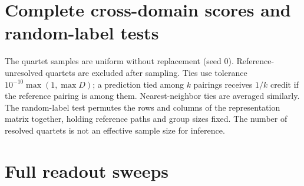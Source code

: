 \documentclass[mlmain]{jmlr}
\begin{document}
\section{Complete cross-domain scores and random-label tests}
\label{app:fullresults}

\begin{table}[h]
\centering\small
\caption{E: Euclidean; C: cosine; FM: FastME. $Q_D$ is direct distance quartet agreement, while
$Q_{NJ}$ and $Q_{FM}$ score the reconstructed trees on the same reference-resolved quartets.
Split columns give recovered/available counts. NN uses text branch, speech family, protein class,
vision metaclass and cell grouping.}
\end{table}

\begin{table}[h]
\centering\footnotesize
\caption{Source-label permutation results. The minimum attainable reported $p$ is $1/2001$.
For each tested quartet, the four-point residual is $(s_{(3)}-s_{(2)})/(2\max D)$, where $s$ are
the three pair sums. ``Max'' is a sampled maximum for text/vision and exhaustive for the smaller
populations; the mean is not Gromov's maximum four-point constant. For cosine, these remain
descriptive dissimilarity residuals. No multiple-comparison-adjusted discovery claim is made.}
\end{table}

The quartet samples are uniform without replacement (seed 0). Reference-unresolved quartets are
excluded after sampling. Ties use tolerance $10^{-10}\max(1,\max D)$; a prediction tied among $k$
pairings receives $1/k$ credit if the reference pairing is among them. Nearest-neighbor ties are
averaged similarly. The random-label test permutes the rows and columns of the representation
matrix together, holding reference paths and group sizes fixed. The number of resolved quartets
is not an effective sample size for inference.

\section{Full readout sweeps}
\label{app:readouts}
\end{document}
